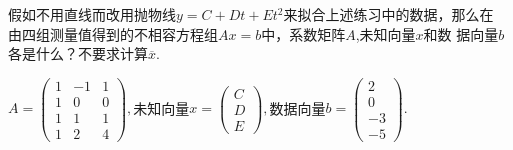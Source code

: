 ﻿\documentclass{book} \usepackage{exsheets} \usepackage{xeCJK}
\begin{document}
\begin{question}
  假如不用直线而改用抛物线$y=C+Dt+Et^2$来拟合上述练习中的数据，那么在
  由四组测量值得到的不相容方程组$Ax=b$中，系数矩阵$A$,未知向量$x$和数
  据向量$b$各是什么？不要求计算$\overline{x}$.
\end{question}
\begin{solution}
  $A=
  \begin{pmatrix}
    1&-1&1\\
    1&0&0\\
    1&1&1\\
    1&2&4
  \end{pmatrix},
$未知向量$x=
\begin{pmatrix}
  C\\
D\\
E
\end{pmatrix},
$数据向量$b=
\begin{pmatrix}
  2\\
0\\
-3\\
-5
\end{pmatrix}.
$
\end{solution}
\end{document}
